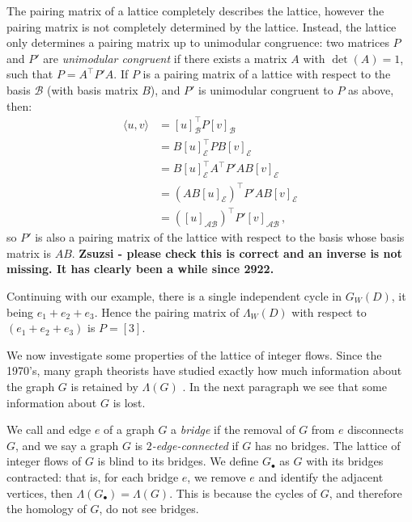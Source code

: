 \documentclass[12pt]{report}
\newcommand{\notered}[1]{{\color{Red} \textbf{#1}}}
\begin{document}
The pairing matrix of a lattice completely describes the lattice, however the pairing matrix is not completely determined by the lattice. Instead, the lattice only determines a pairing matrix up to unimodular congruence: two matrices $P$ and $P'$ are \textit{unimodular congruent} if there exists a matrix $A$ with $\det(A) = 1$, such that $P = A^{\top}P'A$. If $P$ is a pairing matrix of a lattice with respect to the basis $\mathcal{B}$ (with basis matrix $B$), and $P'$ is unimodular congruent to $P$ as above, then:
\begin{align*}
	\langle u, v \rangle & = [u]_{\mathcal{B}}^{\top} P [v]_{\mathcal{B}}                    \\
	                     & = B[u]_{\mathcal{E}}^{\top} P B[v]_{\mathcal{E}}                  \\
	                     & = B[u]_{\mathcal{E}}^{\top} A^{\top} P' A B[v]_{\mathcal{E}}      \\
	                     & = \left( AB[u]_{\mathcal{E}} \right)^{\top} P' AB[v]_{\mathcal{E}} \\
	                     & = \left( [u]_{\mathcal{AB}} \right)^{\top} P' [v]_{\mathcal{AB}}\,,
\end{align*}
so $P'$ is also a pairing matrix of the lattice with respect to the basis whose basis matrix is $AB$. \notered{Zsuzsi - please check this is correct and an inverse is not missing. It has clearly been a while since 2922.}


Continuing with our example, there is a single independent cycle in $G_{W}(D)$, it being $e_{1} + e_{2} + e_{3}$. Hence the pairing matrix of $\Lambda_{W}(D)$ with respect to $( e_{1} + e_{2} + e_{3})$ is $P = [3]$.

We now investigate some properties of the lattice of integer flows. Since the 1970's, many graph theorists have studied exactly how much information about the graph $G$ is retained by $\Lambda(G)$ \parencite{lattice-of-flows-cuts, torelli-for-graphs-tropical-curves, lattice-of-flows-regular-matroid}. In the next paragraph we see that some information about $G$ is lost.

We call and edge $e$ of a graph $G$ a \textit{bridge} if the removal of $G$ from $e$ disconnects $G$, and we say a graph $G$ is \textit{$2$-edge-connected} if $G$ has no bridges. The lattice of integer flows of $G$ is blind to its bridges. We define $G_{\bullet}$ as $G$ with its bridges contracted: that is, for each bridge $e$, we remove $e$ and identify the adjacent vertices, then $\Lambda(G_{\bullet}) = \Lambda(G)$. This is because the cycles of $G$, and therefore the homology of $G$, do not see bridges.
\end{document}
